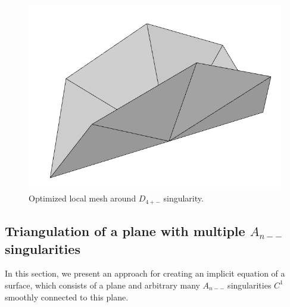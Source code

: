 \begin{figure}
    \centerline{\includegraphics[scale=0.25]{images/D4-after}}
    \caption[Optimized local mesh around $D_{4+-}$ singularity]
    {Optimized local mesh around $D_{4+-}$ singularity.}
    \label{img:D4-after}
\end{figure}

\subsection{Triangulation of a plane with multiple $A_{n--}$ singularities}
In this section, we present an approach for creating an implicit equation of a
surface, which consists of a plane and arbitrary many $A_{n--}$ singularities
$C^1$ smoothly connected to this plane. 
